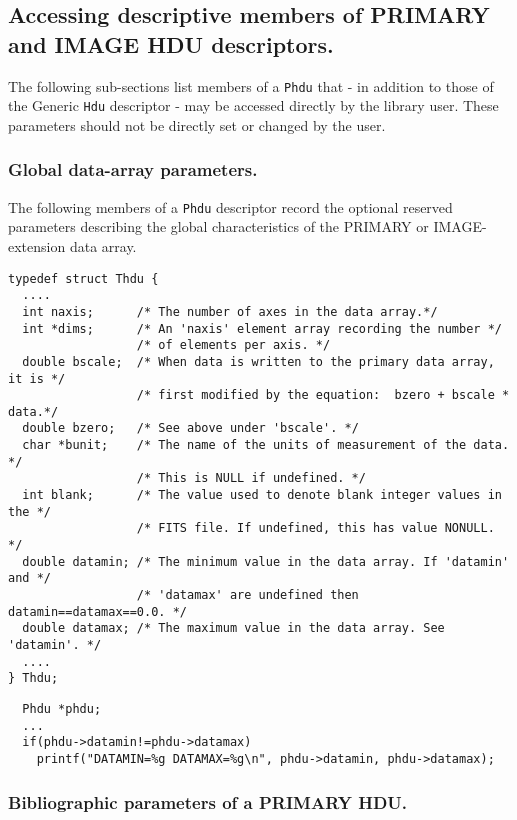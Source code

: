 \subsection{Accessing descriptive members of PRIMARY and IMAGE HDU descriptors.}

The following sub-sections list members of a \verb`Phdu` that - in
addition to those of the Generic \verb`Hdu` descriptor - may be
accessed directly by the library user. These parameters should not be
directly set or changed by the user.

\subsubsection{Global data-array parameters.}
The following members of a \verb`Phdu` descriptor record the optional
reserved parameters describing the global characteristics of the
PRIMARY or IMAGE-extension data array.

\begin{verbatim}
typedef struct Thdu {
  ....
  int naxis;      /* The number of axes in the data array.*/
  int *dims;      /* An 'naxis' element array recording the number */
                  /* of elements per axis. */
  double bscale;  /* When data is written to the primary data array, it is */
                  /* first modified by the equation:  bzero + bscale * data.*/
  double bzero;   /* See above under 'bscale'. */
  char *bunit;    /* The name of the units of measurement of the data. */
                  /* This is NULL if undefined. */
  int blank;      /* The value used to denote blank integer values in the */
                  /* FITS file. If undefined, this has value NONULL. */
  double datamin; /* The minimum value in the data array. If 'datamin' and */
                  /* 'datamax' are undefined then datamin==datamax==0.0. */
  double datamax; /* The maximum value in the data array. See 'datamin'. */
  ....
} Thdu;
\end{verbatim}

\begin{verbatim}
  Phdu *phdu;
  ...
  if(phdu->datamin!=phdu->datamax)
    printf("DATAMIN=%g DATAMAX=%g\n", phdu->datamin, phdu->datamax);
\end{verbatim}

\subsubsection{Bibliographic parameters of a PRIMARY HDU.}

